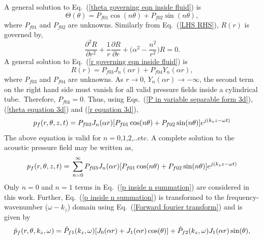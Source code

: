 \documentclass[11pt,cleanfoot]{asme2ej}
\begin{document}
A general solution to Eq.~(\ref{theta governing eqn inside fluid}) is
\begin{equation}\label{theta equation 3d}
    \Theta(\theta) = P_{f01} \cos(n \theta) + P_{f02} \sin(n \theta),
\end{equation}
where $P_{f01}$ and $P_{f02}$ are unknowns. Similarly from Eq.~(\ref{LHS RHS}), $R(r)$ is governed by,
\begin{equation}\label{r governing eqn inside fluid}
    \frac{\partial^{2}R}{\partial r^{2}} + \frac{1}{r}\frac{\partial R}{\partial r} + \bigg(\alpha^2 - \frac{n^2}{r^2}\bigg)R = 0.
\end{equation}
A general solution to Eq.~(\ref{r governing eqn inside fluid}) is
\begin{equation}\label{r equation 3d}
    R(r) = P_{f03} J_n(\alpha r) + P_{f04} Y_n(\alpha r),
\end{equation}
where $P_{f03}$ and $P_{f04}$ are unknowns. As $r \rightarrow 0$, $Y_n(\alpha r) \rightarrow -\infty$, the second term on the right hand side must vanish for all valid pressure fields inside a cylindrical tube.~Therefore, $P_{f04} = 0$. Thus, using Eqs.~(\ref{P in variable separable form 3d}), (\ref{theta equation 3d}) and (\ref{r equation 3d}),
\begin{equation}\label{P inside 3d untransformed in z,t}
    p_f(r,\theta,z,t) =\\  P_{f03} J_n(\alpha r)[P_{f01} \cos(n \theta) + P_{f02} \sin(n \theta)]e^{j(k_{z}z-\omega t)}
\end{equation}
The above equation is valid for $n=0$,$1$,$2$,..etc. A complete solution to the acoustic pressure field may be written as,
\begin{equation}\label{p inside n summation}
    p_f(r,\theta,z,t) =\\  \sum_{n=0}^{\infty}P_{f03} J_n(\alpha r)[P_{f01} \cos(n \theta) + P_{f02} \sin(n \theta)]e^{j(k_{z}z-\omega t)}
\end{equation}
Only $n=0$ and $n=1$ terms in Eq.~(\ref{p inside n summation}) are considered in this work. Further, Eq.~(\ref{p inside n summation}) is transformed to the frequency-wavenumber ($\omega-k_z$) domain using Eq.~(\ref{Forward fourier transform}) and is given by
\begin{equation}\label{P inside 3d}
    \Hat{p}_f(r,\theta,k_z,\omega) =\\ \Hat{P}_{f1}(k_z,\omega)[J_0(\alpha r) + J_1(\alpha r)\cos(\theta)] + \Hat{P}_{f2}(k_z,\omega)J_1(\alpha r)\sin(\theta),
\end{equation}
\end{document}
